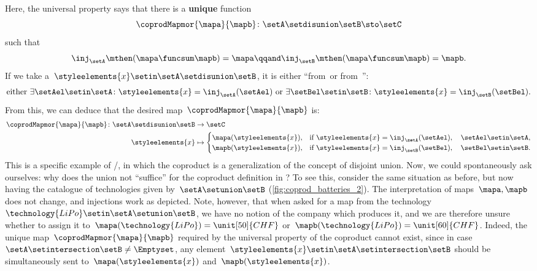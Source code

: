 \begin{example}
    Here, the universal property says that there is a \textbf{unique} function
    \begin{equation}
        \coprodMapmor{\mapa}{\mapb}\colon \setA \setdisunion \setB \sto \setC
    \end{equation} such that
    \begin{equation}
        \label{eq:exa-batt-factoring-maps}
        \inj_\setA\mthen (\mapa \funcsum \mapb)=\mapa
        \qqand
        \inj_\setB\mthen (\mapa \funcsum \mapb)=\mapb.
    \end{equation}
    If we take a~$\styleelements{x}\setin \setA \setdisunion \setB$, it is either ``from~\setA or from~\setB'':
    \begin{equation}
        \label{eq:exa-batt-explain-sum-map}
        \text{either } \exists \setAel\setin \setA\colon \styleelements{x}=\inj_\setA(\setAel) \text{ or }\exists \setBel\setin \setB\colon \styleelements{x}=\inj_\setB(\setBel).
    \end{equation}
    From this, we can deduce that the desired map~$\coprodMapmor{\mapa}{\mapb}$ is:
    \begin{equation}
        \label{eq:exa-batt-def-sum-map}
        \begin{aligned}
            \coprodMapmor{\mapa}{\mapb} \colon  \setA \setdisunion \setB & \to \setC \\
            \styleelements{x}                                            & \mapsto
            \begin{cases}
                \mapa(\styleelements{x}), & \text{if } \styleelements{x}=\inj_\setA(\setAel),\quad \setAel \setin \setA, \\
                \mapb(\styleelements{x}), & \text{if } \styleelements{x}=\inj_\setB(\setBel),\quad \setBel \setin \setB.
            \end{cases}
        \end{aligned}
    \end{equation}
    This is a specific example of \Set/\FinSet, in which the coproduct is a generalization of the concept of disjoint union.
    Now, we could spontaneously ask ourselves: why does the union not ``suffice'' for the coproduct definition in \Set?
    To see this, consider the same situation as before, but now having the catalogue of technologies given by~$\setA\setunion \setB$ (\cref{fig:coprod_batteries_2}).
    The interpretation of maps~$\mapa,\mapb$ does not change, and injections work as depicted.
    Note, however, that when asked for a map from the technology~$\technology{LiPo}\setin \setA\setunion \setB$, we have no notion of the company which produces it, and we are therefore unsure whether to assign it to~$\mapa(\technology{LiPo})=\unit[50]{CHF}$ or~$\mapb(\technology{LiPo})=\unit[60]{CHF}$.
    Indeed, the unique map~$\coprodMapmor{\mapa}{\mapb}$ required by the universal property of the coproduct cannot exist, since in case~$\setA\setintersection \setB\neq \Emptyset$, any element~$\styleelements{x}\setin \setA\setintersection \setB$ should be simultaneously sent to~$\mapa(\styleelements{x})$ and~$\mapb(\styleelements{x})$.
\end{example}

